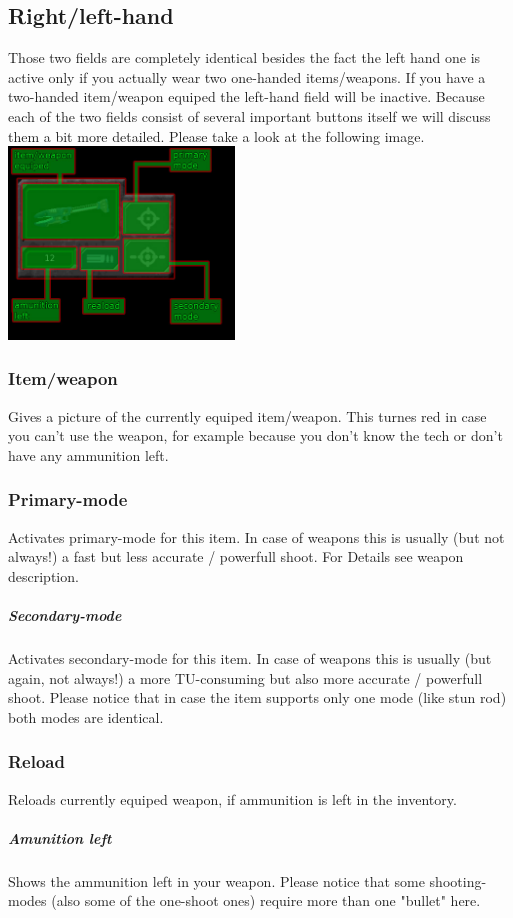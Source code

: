 \subsection{Right/left-hand}
Those two fields are completely identical besides the fact the left hand one is active only if you actually wear two one-handed items/weapons. If you have a two-handed item/weapon equiped the left-hand field will be inactive. Because each of the two fields consist of several important buttons itself we will discuss them a bit more detailed. Please take a look at the following image.
\includegraphics[width=6cm]{images/HQ/weapon_buttons_finalHQ.jpg}
\subsubsection{Item/weapon}
Gives a picture of the currently equiped item/weapon. This turnes red in case you can't use the weapon, for example because you don't know the tech or don't have any ammunition left.
\subsubsection{Primary-mode}
Activates primary-mode for this item. In case of weapons this is usually (but not always!) a fast but less accurate / powerfull shoot. For Details see weapon description.
\subparagraph{Secondary-mode}
Activates secondary-mode for this item. In case of weapons this is usually (but again, not always!) a more TU-consuming but also more accurate / powerfull shoot. Please notice that in case the item supports only one mode (like stun rod) both modes are identical.
\subsubsection{Reload}
Reloads currently equiped weapon, if ammunition is left in the inventory.
\subparagraph{Amunition left}
Shows the ammunition left in your weapon. Please notice that some shooting-modes (also some of the one-shoot ones) require more than one "bullet" here.

